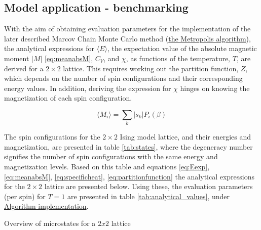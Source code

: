 \documentclass[%
oneside,                 %
final,                   %
10pt]{article}
\begin{document}
\subsection{Model application - benchmarking}
\label{SS:M.Model_application}
With the aim of obtaining evaluation parameters for the implementation of the later described Marcov Chain Monte Carlo method (\hyperref[SS:MCMCmethod]{the Metropolis algorithm}), the analytical expressions for $\langle E \rangle$, the expectation value of the absolute magnetic moment $|M|$ \eqref{eq:meanabsM}, $C_V$, and $\chi$, as functions of the temperature, $T$, are derived for a $2 \times 2$ lattice. This requires working out the  partition function, $Z$, which depends on the number of spin configurations and their corresponding energy values. In addition, deriving the expression for $\chi$ hinges on knowing the magnetization of each spin configuration. \newline

\begin{equation}
\langle M_i \rangle =\sum_{k} |s_k| P_i(\beta)
\label{eq:meanabsM}
\end{equation}

The spin configurations for the $2 \times 2$ Ising model lattice, and their energies and magnetization, are presented in table \ref{tab:states}, where the degeneracy number signifies the number of spin configurations with the same energy and magnetization levels. Based on this table and equations \eqref{eq:Eexp}, \eqref{eq:meanabsM}, \ref{eq:specificheat}, \eqref{eq:partitionfunction} the analytical expressions for the $2 \times 2$ lattice are presented below. Using these, the evaluation parameters (per spin) for $T=1$ are presented in table \ref{tab:analytical_values}, under \hyperref[SS:init.algo.impl]{Algorithm implementation}.\newline

\begin{table}[h!tb]
    \centering
    \caption{Overview of microstates for a $2x2$ lattice}
\label{tab:states}
\end{table}
\end{document}
